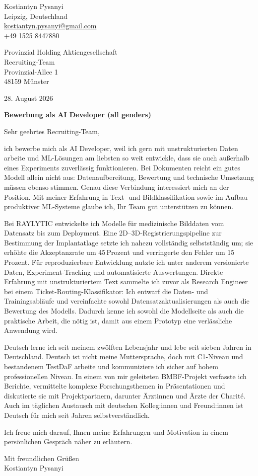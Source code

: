 \documentclass[11pt,a4paper]{article}
\begin{document}
\begin{flushright}
Kostiantyn Pysanyi\\
Leipzig, Deutschland\\
\href{mailto:kostiantyn.pysanyi@gmail.com}{kostiantyn.pysanyi@gmail.com}\\
+49 1525 8447880
\end{flushright}

Provinzial Holding Aktiengesellschaft\\
Recruiting-Team\\
Provinzial-Allee 1\\
48159 Münster

\begin{flushright}
28. August 2026
\end{flushright}

\textbf{Bewerbung als AI Developer (all genders)}

Sehr geehrtes Recruiting-Team,

ich bewerbe mich als AI Developer, weil ich gern mit unstrukturierten Daten arbeite und ML-Lösungen am liebsten so weit entwickle, dass sie auch außerhalb eines Experiments zuverlässig funktionieren. Bei Dokumenten reicht ein gutes Modell allein nicht aus: Datenaufbereitung, Bewertung und technische Umsetzung müssen ebenso stimmen. Genau diese Verbindung interessiert mich an der Position. Mit meiner Erfahrung in Text- und Bildklassifikation sowie im Aufbau produktiver ML-Systeme glaube ich, Ihr Team gut unterstützen zu können.

Bei RAYLYTIC entwickelte ich Modelle für medizinische Bilddaten vom Datensatz bis zum Deployment. Eine 2D--3D-Registrierungspipeline zur Bestimmung der Implantatlage setzte ich nahezu vollständig selbstständig um; sie erhöhte die Akzeptanzrate um 45\,Prozent und verringerte den Fehler um 15\,Prozent. Für reproduzierbare Entwicklung nutzte ich unter anderem versionierte Daten, Experiment-Tracking und automatisierte Auswertungen. Direkte Erfahrung mit unstrukturiertem Text sammelte ich zuvor als Research Engineer bei einem Ticket-Routing-Klassifikator: Ich entwarf die Daten- und Trainingsabläufe und vereinfachte sowohl Datensatzaktualisierungen als auch die Bewertung des Modells. Dadurch kenne ich sowohl die Modellseite als auch die praktische Arbeit, die nötig ist, damit aus einem Prototyp eine verlässliche Anwendung wird.

Deutsch lerne ich seit meinem zwölften Lebensjahr und lebe seit sieben Jahren in Deutschland. Deutsch ist nicht meine Muttersprache, doch mit C1-Niveau und bestandenem TestDaF arbeite und kommuniziere ich sicher auf hohem professionellen Niveau. In einem von mir geleiteten BMBF-Projekt verfasste ich Berichte, vermittelte komplexe Forschungsthemen in Präsentationen und diskutierte sie mit Projektpartnern, darunter Ärztinnen und Ärzte der Charité. Auch im täglichen Austausch mit deutschen Kolleg:innen und Freund:innen ist Deutsch für mich seit Jahren selbstverständlich.

Ich freue mich darauf, Ihnen meine Erfahrungen und Motivation in einem persönlichen Gespräch näher zu erläutern.

Mit freundlichen Grüßen\\[0.8em]
Kostiantyn Pysanyi
\end{document}
